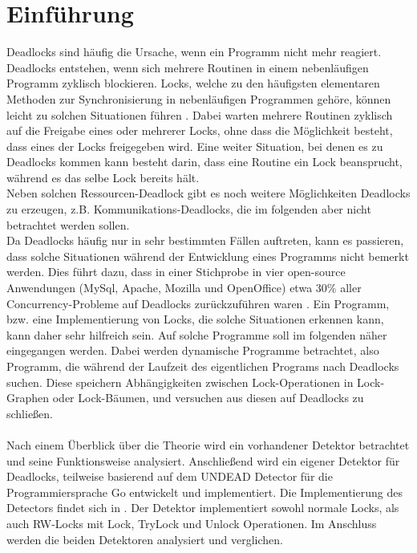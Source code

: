 \chapter{Einführung}
Deadlocks sind häufig die Ursache, wenn ein Programm nicht mehr reagiert\cite{Joshi}.
Deadlocks entstehen, wenn sich mehrere Routinen in einem nebenläufigen 
Programm zyklisch blockieren. Locks, welche zu den häufigsten elementaren 
Methoden zur Synchronisierung in nebenläufigen Programmen gehöre, können 
leicht zu solchen Situationen führen \cite{zhou}. Dabei warten mehrere Routinen 
zyklisch auf die Freigabe eines oder mehrerer Locks, ohne dass die Möglichkeit
besteht, dass eines der Locks freigegeben wird. Eine weiter Situation, 
bei denen es zu Deadlocks kommen kann besteht darin, dass eine Routine 
ein Lock beansprucht, während es das selbe Lock bereits hält.\\ 
Neben solchen Ressourcen-Deadlock gibt es noch weitere Möglichkeiten Deadlocks 
zu erzeugen, z.B. Kommunikations-Deadlocks, die im folgenden aber nicht betrachtet 
werden sollen. \\
Da Deadlocks häufig nur in sehr bestimmten Fällen auftreten, kann es passieren,
dass solche Situationen während der Entwicklung eines Programms nicht bemerkt
werden. Dies führt dazu, dass in einer Stichprobe in vier open-source Anwendungen 
(MySql, Apache, Mozilla und OpenOffice) etwa $30\%$ aller Concurrency-Probleme 
auf Deadlocks zurückzuführen waren \cite{Lu}. Ein Programm, bzw. eine Implementierung 
von Locks, die solche Situationen erkennen kann, kann daher sehr hilfreich sein.
Auf solche Programme soll im folgenden näher eingegangen werden. Dabei werden 
dynamische Programme betrachtet, also Programm, die während der Laufzeit des 
eigentlichen Programs nach Deadlocks suchen. Diese speichern Abhängigkeiten 
zwischen Lock-Operationen in Lock-Graphen oder Lock-Bäumen, und versuchen aus 
diesen auf Deadlocks zu schließen.\\\\
Nach einem Überblick über die Theorie wird ein vorhandener Detektor \cite{sasha-s}
betrachtet und seine Funktionsweise analysiert. Anschließend wird ein eigener 
Detektor für Deadlocks, teilweise basierend auf dem UNDEAD Detector \cite{zhou}
für die Programmiersprache Go entwickelt und implementiert. Die Implementierung des Detectors 
findet sich in \cite{implementation}. Der Detektor implementiert sowohl normale 
Locks, als auch RW-Locks mit Lock, TryLock und Unlock Operationen. Im Anschluss 
werden die beiden Detektoren analysiert und verglichen. 
